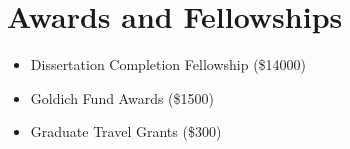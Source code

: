 \section{Awards and Fellowships}
\begin{itemize}
    \item Dissertation Completion Fellowship (\$14000)
    \item Goldich Fund Awards (\$1500)
    \item Graduate Travel Grants (\$300)
\end{itemize}
